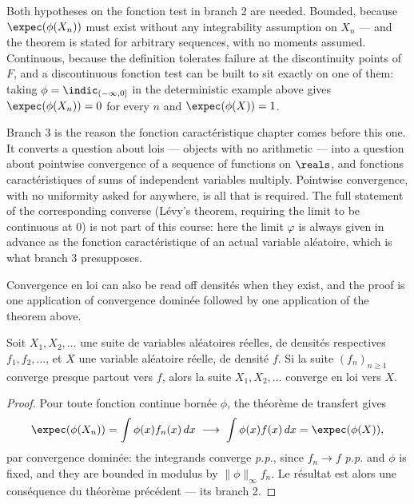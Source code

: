 \begin{remark}
  Both hypotheses on the fonction test in branch 2 are needed. Bounded, because
  $\expec(\phi(X_{n}))$ must exist without any integrability assumption on
  $X_{n}$ --- and the theorem is stated for arbitrary sequences, with no moments
  assumed. Continuous, because the definition tolerates failure at the
  discontinuity points of $F$, and a discontinuous fonction test can be built to
  sit exactly on one of them: taking $\phi = \indic_{(-\infty, 0]}$ in the
  deterministic example above gives $\expec(\phi(X_{n})) = 0$ for every $n$
  and $\expec(\phi(X)) = 1$.
\end{remark}

\begin{remark}
  Branch 3 is the reason the fonction caractéristique chapter comes before this
  one. It converts a question about lois --- objects with no
  arithmetic ---
  into a question about pointwise convergence of a sequence of functions on
  $\reals$, and fonctions caractéristiques of sums of independent variables
  multiply. Pointwise convergence, with no uniformity asked for anywhere, is all
  that is required. The full statement of the corresponding converse (Lévy's
  theorem, requiring the limit to be continuous at $0$) is not part of this
  course: here the limit $\varphi$ is always given in advance as the
  fonction caractéristique of an actual variable aléatoire, which is what
  branch 3 presupposes.
\end{remark}

Convergence en loi can also be read off densités when they exist, and the proof
is one application of convergence dominée followed by one application of the
theorem above.

\begin{prop}
  Soit $X_{1}, X_{2}, \dots$ une suite de variables aléatoires réelles, de
  densités respectives $f_{1}, f_{2}, \dots$, et $X$ une variable aléatoire
  réelle, de densité $f$. Si la suite $(f_{n})_{n \geq 1}$ converge presque
  partout vers $f$, alors la suite $X_{1}, X_{2}, \dots$ converge en loi
  vers $X$.
\end{prop}

\begin{proof}
  Pour toute fonction continue bornée $\phi$, the théorème de transfert gives
  \[
    \expec(\phi(X_{n})) = \int \phi(x) f_{n}(x) \, dx
      \; \longrightarrow \; \int \phi(x) f(x) \, dx = \expec(\phi(X)) ,
  \]
  par convergence dominée: the integrands converge
  \textit{p.p.}, since $f_{n} \to f$ \textit{p.p.} and $\phi$ is fixed, and
  they are bounded in modulus by $\|\phi\|_{\infty} f_{n}$. Le résultat est
  alors une conséquence du théorème précédent --- its branch 2.
\end{proof}


